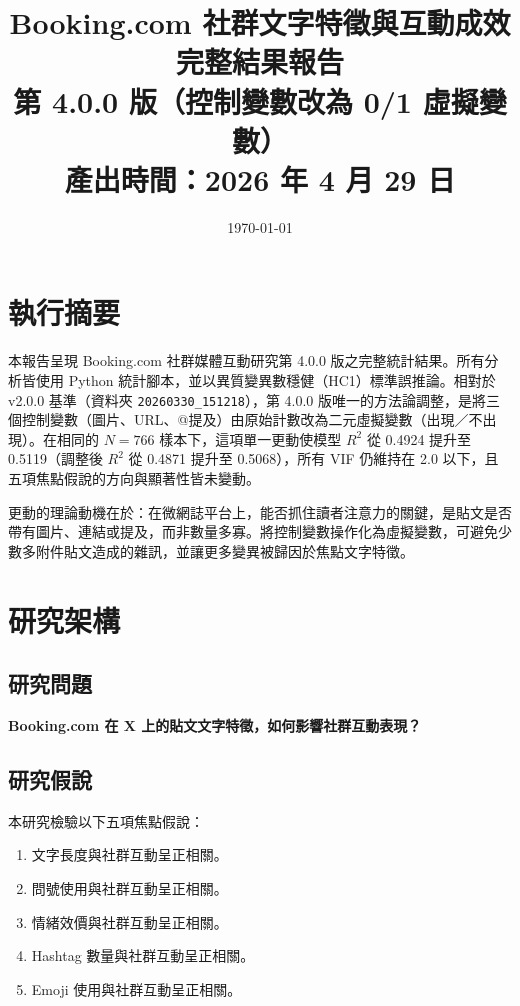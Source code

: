 \documentclass[12pt,a4paper]{ctexart}
\title{Booking.com 社群文字特徵與互動成效完整結果報告\\[0.3em]
\large 第 4.0.0 版（控制變數改為 0/1 虛擬變數）\\[0.3em]
\small 產出時間：2026 年 4 月 29 日}
\author{}
\date{\today}
\begin{document}
\maketitle
\tableofcontents
\newpage

\section*{執行摘要}

本報告呈現 Booking.com 社群媒體互動研究第 4.0.0 版之完整統計結果。所有分析皆使用 Python 統計腳本，並以異質變異數穩健（HC1）標準誤推論。相對於 v2.0.0 基準（資料夾 \texttt{20260330\_151218}），第 4.0.0 版唯一的方法論調整，是將三個控制變數（圖片、URL、@提及）由原始計數改為二元虛擬變數（出現／不出現）。在相同的 $N=766$ 樣本下，這項單一更動使模型 $R^2$ 從 0.4924 提升至 0.5119（調整後 $R^2$ 從 0.4871 提升至 0.5068），所有 VIF 仍維持在 2.0 以下，且五項焦點假說的方向與顯著性皆未變動。

更動的理論動機在於：在微網誌平台上，能否抓住讀者注意力的關鍵，是貼文是否帶有圖片、連結或提及，而非數量多寡。將控制變數操作化為虛擬變數，可避免少數多附件貼文造成的雜訊，並讓更多變異被歸因於焦點文字特徵。

\section{研究架構}

\subsection{研究問題}
\textbf{Booking.com 在 X 上的貼文文字特徵，如何影響社群互動表現？}

\subsection{研究假說}

本研究檢驗以下五項焦點假說：

\begin{enumerate}[label=H\arabic*.]
    \item 文字長度與社群互動呈正相關。
    \item 問號使用與社群互動呈正相關。
    \item 情緒效價與社群互動呈正相關。
    \item Hashtag 數量與社群互動呈正相關。
    \item Emoji 使用與社群互動呈正相關。
\end{enumerate}
\end{document}
